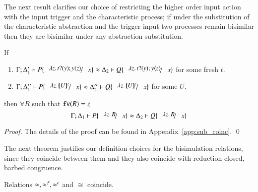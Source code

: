 \begin{comment}
		\item	$\forall \ell \notin \set{\news{\tilde{m}'} \bactout{n}{m}, \news{\tilde{m}} \bactout{n}{\abs{x}{P}}}$ such that
			\[
				\horel{\Gamma}{\Delta_1}{P_1}{\hby{\ell}}{\Delta_1'}{P_2}
			\]
			implies that $\exists Q_2$ such that 
			\[
				\horel{\Gamma}{\Delta_1}{Q_1}{\Hby{\ell}}{\Delta_1'}{Q_2}
			\]
			and
			$\horel{\Gamma}{\Delta_1'}{P_2}{\ \mathcal{R}\ }{\Delta_2'}{Q_2}$

		\item	The symmetric cases of 1, 2 and 3.
	\end{enumerate}
	The Knaster Tarski theorem ensures that the largest bisimulation exists,
	it is called bisimilarity and is denoted by $\wb$.
\end{definition}
\end{comment}

The next result clarifies our choice of restricting
the higher order input action with the input trigger and
the characteristic process; if under the substitution
of the characteristic abstraction and the trigger
input two processes remain bisimilar then they
are bisimilar under any abstraction substitution.

\begin{lemma}\rm
	\label{lem:proc_subst}
	If 
%
	\begin{enumerate}
		\item	$\horel{\Gamma}{\Delta_1'}{P \subst{\abs{z}{\binp{t}{y} \appl{y}{z}}}{x}}{\wb}{\Delta_2}{Q \subst{\abs{z}{\binp{t}{y} \appl{y}{z}}}{x}}$
			for some fresh $t$.

		\item	$\horel{\Gamma}{\Delta_1''}{P \subst{\abs{z}{\mapchar{U}{z}}}{x}}{\wb}{\Delta_2''}{Q \subst{\abs{z}{\mapchar{U}{z}}}{x}}$
			for some $U$.
	\end{enumerate}
%
	then $\forall R$ such that $\mathtt{fv}(R) = z$
\[
	\horel{\Gamma}{\Delta_1}{P \subst{\abs{z}{R}}{x}}{\wb}{\Delta_2}{Q \subst{\abs{z}{R}}{x}}
\]
\end{lemma}

\begin{proof}
	The details of the proof can be found in Appendix~\ref{app:sub_coinc}.
	\qed
\end{proof}

The next theorem justifies our definition choices
for the bisimulation relations, since
they coincide between them and they also
coincide with reduction closed, barbed congruence.

\begin{theorem}[Coincidence]\rm
	\label{the:coincidence}
	Relations $\approx, \approx^f, \approx^{c}$ and $\cong$ coincide.
\end{theorem}

